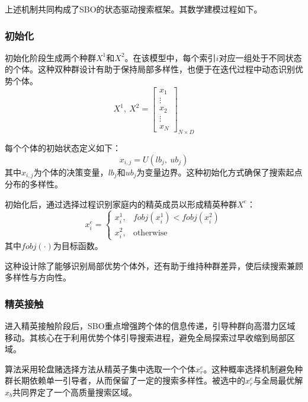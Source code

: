 上述机制共同构成了SBO的状态驱动搜索框架。其数学建模过程如下。

\subsubsection{初始化}

初始化阶段生成两个种群$X^1$和$X^2$。在该模型中，每个索引$i$对应一组处于不同状态的个体。这种双种群设计有助于保持局部多样性，也便于在迭代过程中动态识别优势个体。
\begin{equation}
\label{sbo_eq_1}
X^1,\ X^2={\left[ \begin{array}{c}
x_1 \\
\vdots  \\
x_2 \\
\vdots  \\
x_N \end{array}
\right]}_{N\times D}
\end{equation}

每个个体的初始状态定义如下：
\begin{equation}
\label{sbo_eq_2}
x_{i,j}=U\left(lb_j,\ ub_j\right)
\end{equation}
\noindent 其中$x_{i,j}$为个体的决策变量，$lb_j$和$ub_j$为变量边界。这种初始化方式确保了搜索起点分布的多样性。

初始化后，通过选择过程识别家庭内的精英成员以形成精英种群$X^e$：
\begin{equation}
\label{sbo_eq_3}
x^e_i=
\begin{cases}
x^1_i, & fobj\left(x^1_i\right)<fobj\left(x^2_i\right)\\
x^2_i, & \text{otherwise}
\end{cases}
\end{equation}
\noindent 其中$fobj\left(\cdot \right)$为目标函数。

这种设计除了能够识别局部优势个体外，还有助于维持种群差异，使后续搜索兼顾多样性与方向性。

\subsubsection{精英接触}

进入精英接触阶段后，SBO重点增强跨个体的信息传递，引导种群向高潜力区域移动。其核心在于利用优势个体引导搜索进程，避免全局探索过早收缩到局部区域。

算法采用轮盘赌选择方法\cite{sbo_ref47}从精英子集中选取一个个体$x^e_r$。这种概率选择机制避免种群长期依赖单一引导者，从而保留了一定的搜索多样性。被选中的$x^e_r$与全局最优解$x_b$共同界定了一个高质量搜索区域。

